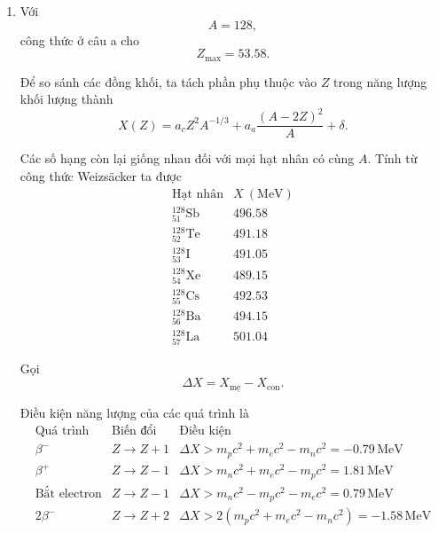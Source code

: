 \documentclass[12pt,a4paper]{article}
\begin{document}
\begin{enumerate}[leftmargin=*,itemsep=1em]
\begin{enumerate}[label=\alph*.,leftmargin=2em,itemsep=1em]
Vì $A$ chẵn nên $N$ và $Z$ có cùng tính chẵn lẻ. Độ lớn của số hạng ghép cặp là
$$
a_pA^{-3/4}
=33.5\times 200^{-3/4}
=0.630\,\mathrm{MeV}.
$$

So sánh các số nguyên gần $Z_{\max}$ bằng công thức đầy đủ:
$$
\begin{array}{c|c|c}
Z&\delta\ (\mathrm{MeV})&B/A\ (\mathrm{MeV})\\ \hline
78&-0.630&8.0477\\
79&+0.630&8.0458\\
80&-0.630&8.0506
\end{array}
$$

Do đó hạt nhân có năng lượng liên kết riêng lớn nhất ứng với
$$
Z=80.
$$

\item
Với
$$
A=128,
$$
công thức ở câu a cho
$$
Z_{\max}=53.58.
$$

Để so sánh các đồng khối, ta tách phần phụ thuộc vào $Z$ trong năng lượng khối
lượng thành
$$
X(Z)=a_cZ^2A^{-1/3}
+a_a\frac{(A-2Z)^2}{A}+\delta.
$$

Các số hạng còn lại giống nhau đối với mọi hạt nhân có cùng $A$. Tính từ công
thức Weizs\"acker ta được
$$
\begin{array}{c|c}
\text{Hạt nhân}&X\ (\mathrm{MeV})\\ \hline
{}_{51}^{128}\mathrm{Sb}&496.58\\
{}_{52}^{128}\mathrm{Te}&491.18\\
{}_{53}^{128}\mathrm{I}&491.05\\
{}_{54}^{128}\mathrm{Xe}&489.15\\
{}_{55}^{128}\mathrm{Cs}&492.53\\
{}_{56}^{128}\mathrm{Ba}&494.15\\
{}_{57}^{128}\mathrm{La}&501.04
\end{array}
$$

Gọi
$$
\Delta X=X_{\text{mẹ}}-X_{\text{con}}.
$$

Điều kiện năng lượng của các quá trình là
$$
\begin{array}{c|c|c}
\text{Quá trình}&\text{Biến đổi}&\text{Điều kiện}\\ \hline
\beta^-&Z\to Z+1&
\Delta X>m_pc^2+m_ec^2-m_nc^2=-0.79\,\mathrm{MeV}\\
\beta^+&Z\to Z-1&
\Delta X>m_nc^2+m_ec^2-m_pc^2=1.81\,\mathrm{MeV}\\
\text{Bắt electron}&Z\to Z-1&
\Delta X>m_nc^2-m_pc^2-m_ec^2=0.79\,\mathrm{MeV}\\
2\beta^-&Z\to Z+2&
\Delta X>2(m_pc^2+m_ec^2-m_nc^2)=-1.58\,\mathrm{MeV}
\end{array}
$$


\end{enumerate}
\end{enumerate}
\end{document}
